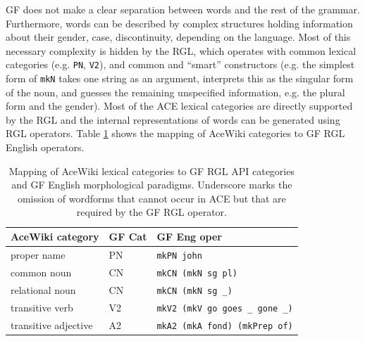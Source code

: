 \documentclass[a4paper]{article}
\def\xp#1{\texttt{#1}}
\begin{document}
GF does not make a clear separation between words and the rest of the grammar.
Furthermore, words can be described by complex structures holding information
about their gender, case, discontinuity, depending on the language. Most of
this necessary complexity is hidden by the RGL, which operates with common
lexical categories (e.g. \texttt{PN}, \texttt{V2}), and common and ``smart''
constructors (e.g. the simplest form of \texttt{mkN} takes one string as an
argument,
interprets this as the singular form of the noun, and guesses the remaining
unspecified information, e.g. the plural form and the gender).
Most of the ACE lexical categories are directly supported by the RGL and the
internal representations of words can be generated using RGL operators.
Table \ref{mapping_acewiki_to_gf} shows the mapping of AceWiki categories
to GF RGL English operators.

\begin{table}
\begin{center}
\begin{tabular}{ l l l }
\hline
AceWiki category & GF Cat & GF Eng oper \\
\hline
proper name & PN & \xp{mkPN john} \\
common noun & CN & \xp{mkCN (mkN sg pl)} \\
relational noun & CN & \xp{mkCN (mkN sg \_)} \\
transitive verb & V2 & \xp{mkV2 (mkV go goes \_ gone \_)} \\
transitive adjective & A2 & \xp{mkA2 (mkA fond) (mkPrep of)} \\
\hline
\end{tabular}
\end{center}
\caption{Mapping of AceWiki lexical categories
to GF RGL API categories and GF English
morphological paradigms. Underscore marks the omission of wordforms that
cannot occur in ACE but that are required by the GF RGL
operator.\protect\label{mapping_acewiki_to_gf}}
\end{table}

%
%
\end{document}
